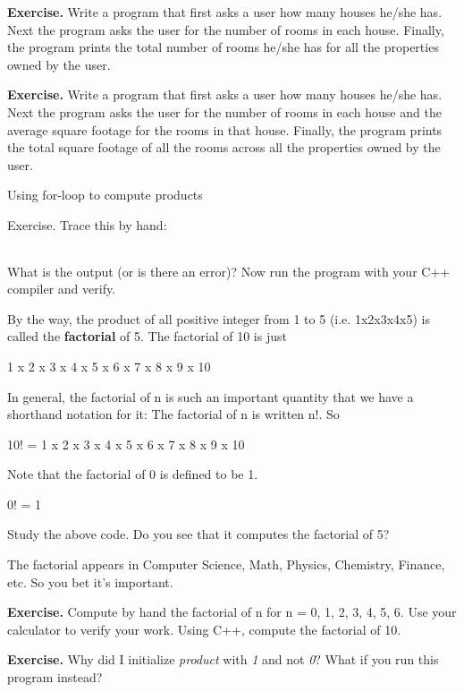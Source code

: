 \documentclass[
]{article}
\begin{document}
\textbf{Exercise.} Write a program that first asks a user how many
houses he/she has. Next the program asks the user for the number of
rooms in each house. Finally, the program prints the total number of
rooms he/she has for all the properties owned by the user.

\textbf{Exercise.} Write a program that first asks a user how many
houses he/she has. Next the program asks the user for the number of
rooms in each house and the average square footage for the rooms in that
house. Finally, the program prints the total square footage of all the
rooms across all the properties owned by the user.

Using for-loop to compute products

Exercise. Trace this by hand:

\begin{longtable}[]{@{}@{}}
\toprule
\endhead
\bottomrule
\end{longtable}

What is the output (or is there an error)? Now run the program with your
C++ compiler and verify.

By the way, the product of all positive integer from 1 to 5 (i.e.
1x2x3x4x5) is called the \textbf{factorial} of 5. The factorial of 10 is
just

1 x 2 x 3 x 4 x 5 x 6 x 7 x 8 x 9 x 10

In general, the factorial of n is such an important quantity that we
have a shorthand notation for it: The factorial of n is written n!. So

10! = 1 x 2 x 3 x 4 x 5 x 6 x 7 x 8 x 9 x 10

Note that the factorial of 0 is defined to be 1.

0! = 1

Study the above code. Do you see that it computes the factorial of 5?

The factorial appears in Computer Science, Math, Physics, Chemistry,
Finance, etc. So you bet it's important.

\textbf{Exercise.} Compute by hand the factorial of n for n = 0, 1, 2,
3, 4, 5, 6. Use your calculator to verify your work. Using C++, compute
the factorial of 10.

\textbf{Exercise.} Why did I initialize \emph{product} with \emph{1} and
not \emph{0}? What if you run this program instead?

\begin{longtable}[]{@{}@{}}
\toprule
\endhead
\bottomrule
\end{longtable}
\end{document}
